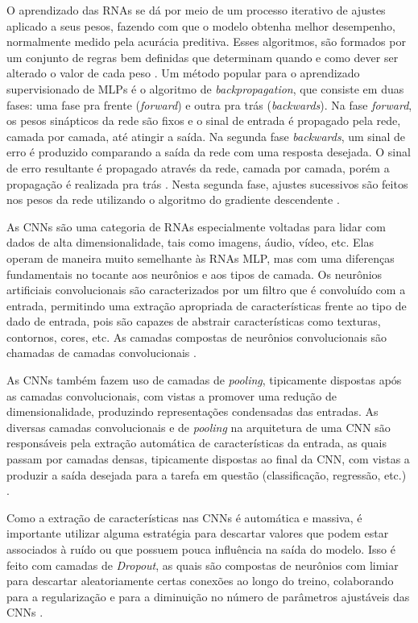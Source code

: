 O aprendizado das RNAs se dá por meio de um processo iterativo de ajustes aplicado a seus pesos, fazendo com que o modelo obtenha melhor desempenho, normalmente medido pela acurácia preditiva. Esses algoritmos, são formados por um conjunto de regras bem definidas que determinam quando e como dever ser alterado o valor de cada peso \cite{Faceli:Livro}. Um método popular para o aprendizado supervisionado de MLPs é o algoritmo de \emph{backpropagation}, que consiste em duas fases: uma fase pra frente (\emph{forward}) e outra pra trás (\emph{backwards}). Na fase \emph{forward}, os pesos sinápticos da rede são fixos e o sinal de entrada é propagado pela rede, camada por camada, até atingir a saída. Na segunda fase \emph{backwards}, um sinal de erro é produzido comparando a saída da rede com uma resposta desejada. O sinal de erro resultante é propagado através da rede, camada por camada, porém a propagação é realizada pra trás \cite{Faceli:Livro,Haykin:NeuralNetworksBook}. Nesta segunda fase, ajustes sucessivos são feitos nos pesos da rede utilizando o algoritmo do gradiente descendente \cite{Teresa:Livro}.

As CNNs são uma categoria de RNAs especialmente voltadas para lidar com dados de alta dimensionalidade, tais como imagens, áudio, vídeo, etc. Elas operam de maneira muito semelhante às RNAs MLP, mas com uma diferenças fundamentais no tocante aos neurônios e aos tipos de camada. Os neurônios artificiais convolucionais são caracterizados por um filtro que é convoluído com a entrada, permitindo uma extração apropriada de características frente ao tipo de dado de entrada, pois são capazes de abstrair características como texturas, contornos, cores, etc. As camadas compostas de neurônios convolucionais são chamadas de camadas convolucionais \cite{Khan:2018}.

As CNNs também fazem uso de camadas de \emph{pooling}, tipicamente dispostas após as camadas convolucionais, com vistas a promover uma redução de dimensionalidade, produzindo representações condensadas das entradas. As diversas camadas convolucionais e de \emph{pooling} na arquitetura de uma CNN são responsáveis pela extração automática de características da entrada, as quais passam por camadas densas, tipicamente dispostas ao final da CNN, com vistas a produzir a saída desejada para a tarefa em questão (classificação, regressão, etc.) \cite{Buduma:2018,Chollet:2017}.

Como a extração de características nas CNNs é automática e massiva, é importante utilizar alguma estratégia para descartar valores que podem estar associados à ruído ou que possuem pouca influência na saída do modelo. Isso é feito com camadas de \emph{Dropout}, as quais são compostas de neurônios com limiar para descartar aleatoriamente certas conexões ao longo do treino, colaborando para a regularização e para a diminuição no número de parâmetros ajustáveis das CNNs \cite{Buduma:2018,Chollet:2017}.

